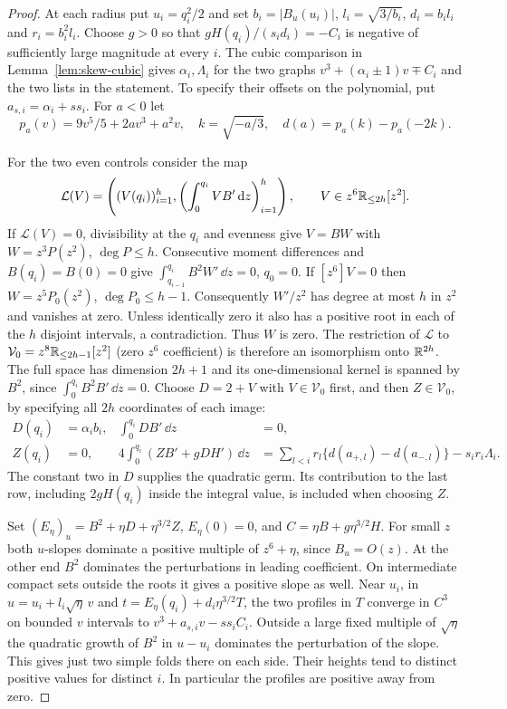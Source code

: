 \begin{proof}
At each radius put $u_i=q_i^2/2$ and set
$b_i=|B_u(u_i)|$, $l_i=\sqrt{3/b_i}$, $d_i=b_i l_i$ and $r_i=b_i^2 l_i$.
Choose $g>0$ so that $gH(q_i)/(s_i d_i)=-C_i$ is negative of sufficiently
large magnitude at every $i$. The cubic comparison in
Lemma~\ref{lem:skew-cubic} gives $\alpha_i,\Lambda_i$ for the two graphs
$v^3+(\alpha_i\pm1)v\mp C_i$ and the two lists in the statement.
To specify their offsets on the polynomial, put
$a_{s,i}=\alpha_i+s s_i$. For $a<0$ let
\[
 p_a(v)=9v^5/5+2av^3+a^2v,\quad k=\sqrt{-a/3},\quad
 d(a)=p_a(k)-p_a(-2k).
\]

For the two even controls consider the map
\[
 {\cal L}(V)=\left((V(q_i))_{i=1}^h,
          \left(\int_0^{q_i}V B'\,\mathrm{d} z\right)_{i=1}^h\right),
 \qquad V\in z^6\mathbb{R}_{\le 2h}[z^2].
\]
If $\mathcal L(V)=0$, divisibility at the $q_i$ and evenness give $V=BW$
with $W=z^3P(z^2)$, $\deg P\le h$. Consecutive moment differences and
$B(q_i)=B(0)=0$ give $\int_{q_{i-1}}^{q_i}B^2 W'\,\dd z=0$, $q_0=0$.
If $[z^6]V=0$ then $W=z^5P_0(z^2)$, $\deg P_0\le h-1$.
Consequently $W'/z^2$ has degree at most $h$ in $z^2$ and vanishes at zero.
Unless identically zero it also has a positive root in each of the $h$
disjoint intervals, a contradiction. Thus $W$ is zero. The restriction of $\mathcal L$ to
$\mathcal V_0=z^8\mathbb{R}_{\le 2h-1}[z^2]$ (zero $z^6$ coefficient) is
therefore an isomorphism onto $\mathbb{R}^{2h}$. The full space has dimension
$2h+1$ and its one-dimensional kernel is spanned by $B^2$, since
$\int_0^{q_i}B^2B'\,\dd z=0$. Choose $D=2+V$ with $V\in\mathcal V_0$
first, and then $Z\in\mathcal V_0$, by specifying all $2h$ coordinates
of each image:
\begin{align}
 D(q_i)&=\alpha_i b_i,& \int_0^{q_i} D B'\,\dd z&=0,\nonumber\\
 Z(q_i)&=0,&4\int_0^{q_i}(Z B'+g D H')\,\dd z
 &=\sum_{l<i}r_l\{d(a_{+,l})-d(a_{-,l})\}-s_i r_i\Lambda_i .
                                                              \label{eq:offset}
\end{align}
The constant two in $D$ supplies the quadratic germ. Its contribution
to the last row, including $2gH(q_i)$ inside the integral value, is
included when choosing $Z$.

Set $(E_\eta)_u=B^2+\eta D+\eta^{3/2}Z$, $E_\eta(0)=0$, and
$C=\eta B+g\eta^{3/2}H$. For small $z$ both $u$-slopes dominate a
positive multiple of $z^6+\eta$, since $B_u=O(z)$. At the other end
$B^2$ dominates the perturbations in leading coefficient. On intermediate
compact sets outside the roots it gives a positive slope as well. Near
$u_i$, in $u=u_i+l_i\sqrt\eta\,v$ and
$t=E_\eta(q_i)+d_i\eta^{3/2}T$, the two profiles in $T$ converge in $C^3$
on bounded $v$ intervals to
$v^3+a_{s,i}v-s s_i C_i$. Outside a large fixed multiple of $\sqrt\eta$
the quadratic growth of $B^2$ in $u-u_i$ dominates the perturbation of
the slope. This gives just two simple folds there on each side.
Their heights tend to distinct positive values for distinct $i$.
In particular the profiles are positive away from zero.


\end{proof}

